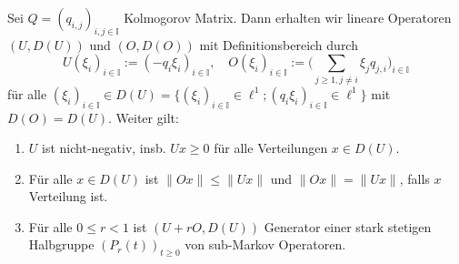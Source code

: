 \begin{lem}
  Sei $Q=(q_{i,j})_{i,j\in\mathbb I}$ Kolmogorov Matrix. Dann erhalten wir lineare Operatoren  $(U,D(U))$ und $(O,D(O))$ mit Definitionsbereich durch  $$U(\xi_i)_{i\in\mathbb I}:=(-q_i\xi_i)_{i\in\mathbb I},\quad O(\xi_i)_{i\in\mathbb I}:=\big(\sum_{j\geq1,j\neq i}\xi_jq_{j,i}\big)_{i\in\mathbb I}$$ für alle  $(\xi_i)_{i\in\mathbb I}\in D(U)=\Big\{(\xi_i)_{i\in\mathbb I}\in\ell^1;(q_i\xi_i)_{i\in\mathbb I}\in\ell^1\Big\}$ mit $D(O)=D(U)$. Weiter gilt:
  \begin{enumerate}
    \item $U$ ist nicht-negativ, insb. $Ux\geq0$ für alle Verteilungen $x\in D(U)$.
    \item Für alle $x\in D(U)$ ist $\|Ox\|\leq\|Ux\|$ und $\|Ox\|=\|Ux\|$, falls $x$ Verteilung ist.
    \item Für alle $0\leq r< 1$ ist $(U+rO, D(U))$ Generator einer stark stetigen Halbgruppe $(P_r(t))_{t\geq0}$ von sub-Markov Operatoren.
    \end{enumerate}
\end{lem}

